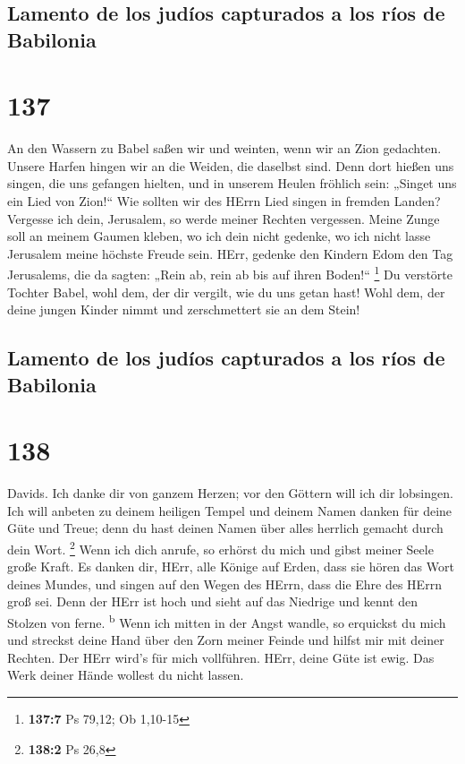 \hypertarget{lamento-de-los-juduxedos-capturados-a-los-ruxedos-de-babilonia}{%
\subsection{Lamento de los judíos capturados a los ríos de
Babilonia}\label{lamento-de-los-juduxedos-capturados-a-los-ruxedos-de-babilonia}}

\hypertarget{section-136}{%
\section{137}\label{section-136}}

 An den Wassern zu Babel saßen wir und weinten, wenn wir
an Zion gedachten.  Unsere Harfen hingen wir an die
Weiden, die daselbst sind.  Denn dort hießen uns singen,
die uns gefangen hielten, und in unserem Heulen fröhlich sein: „Singet
uns ein Lied von Zion!{}``  Wie sollten wir des HErrn Lied
singen in fremden Landen?  Vergesse ich dein, Jerusalem,
so werde meiner Rechten vergessen.  Meine Zunge soll an
meinem Gaumen kleben, wo ich dein nicht gedenke, wo ich nicht lasse
Jerusalem meine höchste Freude sein.  HErr, gedenke den
Kindern Edom den Tag Jerusalems, die da sagten: „Rein ab, rein ab bis
auf ihren Boden!{}`` \footnote{\textbf{137:7} Ps 79,12; Ob 1,10-15}
 Du verstörte Tochter Babel, wohl dem, der dir vergilt,
wie du uns getan hast!  Wohl dem, der deine jungen Kinder
nimmt und zerschmettert sie an dem Stein!

\hypertarget{lamento-de-los-juduxedos-capturados-a-los-ruxedos-de-babilonia-1}{%
\subsection{Lamento de los judíos capturados a los ríos de
Babilonia}\label{lamento-de-los-juduxedos-capturados-a-los-ruxedos-de-babilonia-1}}

\hypertarget{section-137}{%
\section{138}\label{section-137}}

 Davids. Ich danke dir von ganzem Herzen; vor den Göttern
will ich dir lobsingen.  Ich will anbeten zu deinem
heiligen Tempel und deinem Namen danken für deine Güte und Treue; denn
du hast deinen Namen über alles herrlich gemacht durch dein Wort.
\footnote{\textbf{138:2} Ps 26,8}  Wenn ich dich anrufe,
so erhörst du mich und gibst meiner Seele große Kraft.  Es
danken dir, HErr, alle Könige auf Erden, dass sie hören das Wort deines
Mundes,  und singen auf den Wegen des HErrn, dass die Ehre
des HErrn groß sei.  Denn der HErr ist hoch und sieht auf
das Niedrige und kennt den Stolzen von ferne. \textsuperscript{b}
 Wenn ich mitten in der Angst wandle, so erquickst du mich
und streckst deine Hand über den Zorn meiner Feinde und hilfst mir mit
deiner Rechten.  Der HErr wird's für mich vollführen.
HErr, deine Güte ist ewig. Das Werk deiner Hände wollest du nicht
lassen.

